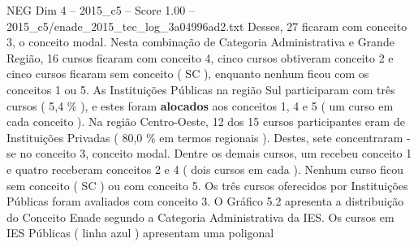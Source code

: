 \begin{textsample}{NEG Dim 4 – 2015\_c5 – Score 1.00 – 2015\_c5/enade\_2015\_tec\_log\_3a04996ad2.txt}
Desses, 27 ficaram com conceito 3, o conceito modal.
Nesta combinação de Categoria Administrativa e Grande Região, 16 cursos ficaram com conceito 4, cinco cursos obtiveram conceito 2 e cinco cursos ficaram sem conceito ( SC ), enquanto nenhum ficou com os conceitos 1 ou 5.
As Instituições Públicas na região Sul participaram com três cursos ( 5,4 \% ), e estes foram \textbf{alocados} aos conceitos 1, 4 e 5 ( um curso em cada conceito ).
Na região Centro-Oeste, 12 dos 15 cursos participantes eram de Instituições Privadas ( 80,0 \% em termos regionais ).
Destes, sete concentraram -se no conceito 3, conceito modal.
Dentre os demais cursos, um recebeu conceito 1 e quatro receberam conceitos 2 e 4 ( dois cursos em cada ).
Nenhum curso ficou sem conceito ( SC ) ou com conceito 5.
Os três cursos oferecidos por Instituições Públicas foram avaliados com conceito 3.
O Gráfico 5.2 apresenta a distribuição do Conceito Enade segundo a Categoria Administrativa da IES.
Os cursos em IES Públicas ( linha azul ) apresentam uma poligonal

\end{textsample}
